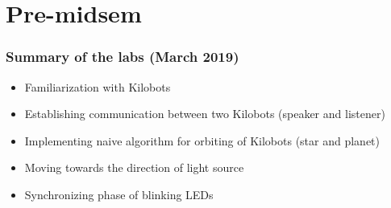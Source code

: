 \section{Pre-midsem}
\begin{frame}
    \frametitle{Summary of the labs (March 2019)}
    \begin{itemize}
        \item Familiarization with Kilobots
        \item Establishing communication between two Kilobots (speaker and listener)
        \item Implementing naive algorithm for orbiting of Kilobots (star and planet)
        \item Moving towards the direction of light source
        \item Synchronizing phase of blinking LEDs
    \end{itemize}
\end{frame}